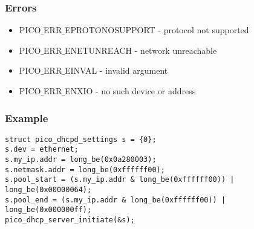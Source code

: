 \subsubsection*{Errors}
\begin{itemize}
\item PICO$\_$ERR$\_$EPROTONOSUPPORT - protocol not supported
\item PICO$\_$ERR$\_$ENETUNREACH - network unreachable 
\item PICO$\_$ERR$\_$EINVAL - invalid argument
\item PICO$\_$ERR$\_$ENXIO - no such device or address
\end{itemize}

\subsubsection*{Example}
\begin{verbatim}
struct pico_dhcpd_settings s = {0};
s.dev = ethernet;
s.my_ip.addr = long_be(0x0a280003);
s.netmask.addr = long_be(0xffffff00);
s.pool_start = (s.my_ip.addr & long_be(0xffffff00)) | long_be(0x00000064);
s.pool_end = (s.my_ip.addr & long_be(0xffffff00)) | long_be(0x000000ff);
pico_dhcp_server_initiate(&s);
\end{verbatim}


